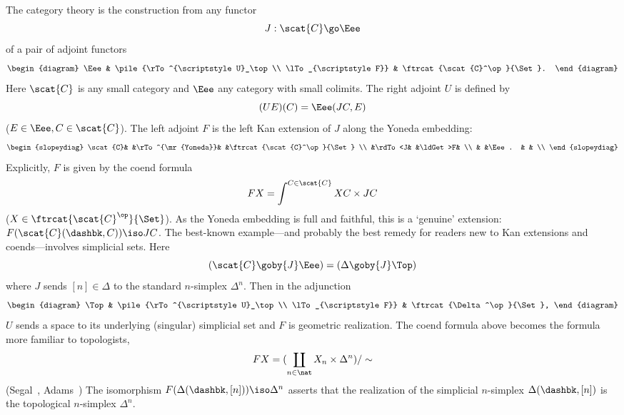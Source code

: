 The category theory is the construction from any functor
\[
J: \scat{C} \go \Eee
\]
of a pair of adjoint functors
%
\begin{equation}	\label{eq:induced-adjn}
\begin{diagram}
\Eee	&
\pile{\rTo^{\scriptstyle U}_\top\\ \lTo_{\scriptstyle F}}	&
\ftrcat{\scat{C}^\op}{\Set}.
\end{diagram}
\end{equation}
%
Here $\scat{C}$ is any small category and $\Eee$ any category with small
colimits.  The right adjoint $U$ is defined by
\[
(UE)(C) = \Eee(JC, E)
\]
($E\in\Eee, C\in\scat{C}$).  The left adjoint $F$ is the left Kan%
%
%
extension
of $J$ along the Yoneda embedding:
\[
\begin{slopeydiag}
\scat{C}&	&\rTo^{\mr{Yoneda}}&	&\ftrcat{\scat{C}^\op}{\Set}	\\
	&\rdTo<J&		&\ldGet>F&				\\
	&	&\Eee.		&	&				\\
\end{slopeydiag}
\]
Explicitly, $F$ is given by the coend formula
\[
FX = \int^{C\in\scat{C}} XC \times JC
\]
($X \in \ftrcat{\scat{C}^\op}{\Set}$).  As the Yoneda embedding is full and
faithful, this is a `genuine' extension: $F(\scat{C}(\dashbk,C)) \iso JC$.
The best-known example---and probably the best remedy for readers new to
Kan extensions and coends---involves%
%
%
simplicial sets.  Here
\[
(\scat{C} \goby{J} \Eee) 
=
(\Delta \goby{J} \Top)
\]
where $J$ sends $[n] \in \Delta$ to the standard $n$-simplex $\Delta^n$.
Then in the adjunction
\[
\begin{diagram}
\Top	&
\pile{\rTo^{\scriptstyle U}_\top\\ \lTo_{\scriptstyle F}}	&
\ftrcat{\Delta^\op}{\Set},
\end{diagram}
\]
$U$ sends a space to its underlying (singular) simplicial set and $F$ is
geometric%
%
%
realization.  The coend formula above becomes the formula more
familiar to topologists,
\[
FX = ( \coprod_{n\in\nat} X_n \times \Delta^n ) /\sim
\]
(Segal~\cite[\S 1]{SegCSS}, Adams~\cite[p.~58]{Ad}) The isomorphism
$F(\Delta(\dashbk,[n])) \iso \Delta^n$ asserts that the realization of the
simplicial $n$-simplex $\Delta(\dashbk,[n])$ is the topological $n$-simplex
$\Delta^n$.


